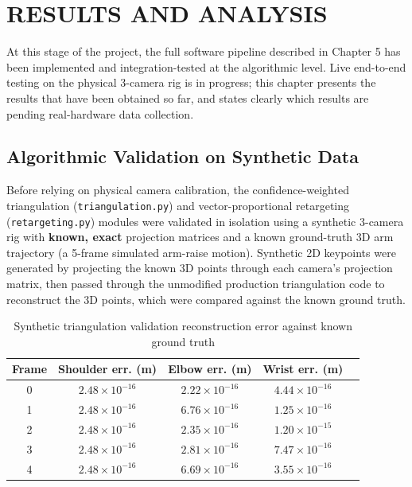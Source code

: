 \chapter{RESULTS AND ANALYSIS}

At this stage of the project, the full software pipeline described in
Chapter 5 has been implemented and integration-tested at the algorithmic
level. Live end-to-end testing on the physical 3-camera rig is in
progress; this chapter presents the results that have been obtained so
far, and states clearly which results are pending real-hardware data
collection.

\section{Algorithmic Validation on Synthetic Data}

Before relying on physical camera calibration, the confidence-weighted
triangulation (\texttt{triangulation.py}) and vector-proportional
retargeting (\texttt{retargeting.py}) modules were validated in isolation
using a synthetic 3-camera rig with \textbf{known, exact} projection
matrices and a known ground-truth 3D arm trajectory (a 5-frame simulated
arm-raise motion). Synthetic 2D keypoints were generated by projecting the
known 3D points through each camera's projection matrix, then passed
through the unmodified production triangulation code to reconstruct the
3D points, which were compared against the known ground truth.

\begin{table}[h]
\centering
\caption{Synthetic triangulation validation  reconstruction error against known ground truth}
\label{tab:synthetic-validation}
\begin{tabular}{ccccc}
\hline
\textbf{Frame} & \textbf{Shoulder err. (m)} & \textbf{Elbow err. (m)} & \textbf{Wrist err. (m)} \\
\hline
0 & $2.48\times10^{-16}$ & $2.22\times10^{-16}$ & $4.44\times10^{-16}$ \\
1 & $2.48\times10^{-16}$ & $6.76\times10^{-16}$ & $1.25\times10^{-16}$ \\
2 & $2.48\times10^{-16}$ & $2.35\times10^{-16}$ & $1.20\times10^{-15}$ \\
3 & $2.48\times10^{-16}$ & $2.81\times10^{-16}$ & $7.47\times10^{-16}$ \\
4 & $2.48\times10^{-16}$ & $6.69\times10^{-16}$ & $3.55\times10^{-16}$ \\
\hline
\end{tabular}
\end{table}

